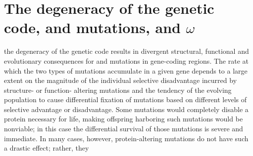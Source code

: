 
\section{The degeneracy of the genetic code, \nsyn and \syn mutations, and $\omega$}

the degeneracy of the genetic
code results in divergent structural, functional and evolutionary
consequences for \syn and \nsyn mutations in gene-coding regions. The
rate at which the two types of mutations accumulate in a given gene
depends to a large extent on the magnitude of the individual selective
disadvantage incurred by structure- or function- altering \nsyn
mutations and the tendency of the evolving population to cause
differential fixation of mutations based on different levels of
selective advantage or disadvantage. Some \nsyn mutations would
completely disable a protein necessary for life, making offspring
harboring such mutations would be nonviable; in this case the
differential survival of those mutations is severe and immediate. In
many cases, however, protein-altering mutations do not have such a
drastic effect; rather, they 
